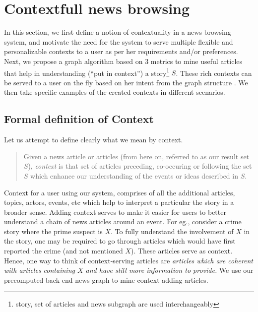 \section{Contextfull news browsing}
\label{sec:newsgraph}

In this section, we first define a notion of contextuality in a news browsing system, and motivate the need for the system to serve multiple flexible and personalizable contexts to a user as per her
requirements and/or preferences. Next, we propose a graph algorithm based on 3 metrics to mine
useful articles that help in understanding (``put in context'') a story\footnote{story, set of articles and news subgraph are used interchangeably} $S$. These rich contexts can be served to a user on the fly based on her intent 
from the graph structure . We then take specific examples of the created contexts in different scenarios.

\subsection{Formal definition of Context}
Let us attempt to define clearly what we mean by context. 
\begin{quote}
Given a news article or articles (from here on, referred to as our result set $S$), {\em context} is that set of articles
preceding, co-occuring or following the set $S$ which enhance our understanding of the events or ideas described in $S$.
\end{quote}

Context for a user using our system, comprises of all the additional articles, topics,
actors, events, etc which help to interpret a particular the story in a broader sense. Adding
context serves to make it easier for users to better understand a chain
of news articles around an event. For eg., consider a crime story
where the prime suspect is $X$. To fully understand the involvement of $X$ in the story,
one may be required to go through articles which would have first reported the crime (and not 
mentioned $X$). These articles serve as context. Hence, one way to think of context-serving articles
are \emph{articles which are coherent with articles containing $X$ and have still more information to provide.} We use our precomputed back-end news graph to mine context-adding articles.

